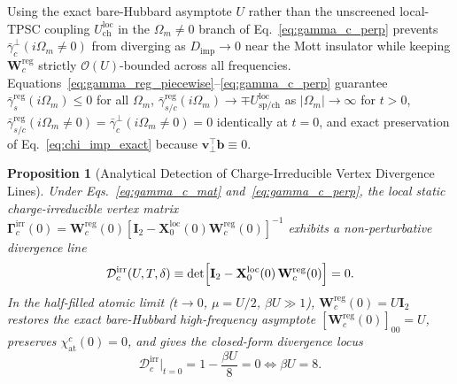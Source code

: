 \documentclass[11pt,a4paper]{article}
\numberwithin{equation}{section}
\theoremstyle{plain}
\newtheorem{proposition}{Proposition}[section]
\theoremstyle{definition}
\begin{document}
Using the exact bare-Hubbard asymptote $U$ rather than the unscreened local-TPSC
coupling $U_{\mathrm{ch}}^{\mathrm{loc}}$ in the $\Omega_m \neq 0$ branch of
Eq.~\eqref{eq:gamma_c_perp} prevents $\bar{\gamma}_c^\perp(i\Omega_m \neq 0)$ from
diverging as $D_{\mathrm{imp}} \to 0$ near the Mott insulator while keeping
$\mathbf{W}_c^{\mathrm{reg}}$ strictly $\mathcal{O}(U)$-bounded across all frequencies.
Equations~\eqref{eq:gamma_reg_piecewise}--\eqref{eq:gamma_c_perp} guarantee
$\bar{\gamma}_s^{\mathrm{reg}}(i\Omega_m) \le 0$ for all $\Omega_m$,
$\bar{\gamma}_{s/c}^{\mathrm{reg}}(i\Omega_m) \to \mp U_{\mathrm{sp/ch}}^{\mathrm{loc}}$
as $|\Omega_m| \to \infty$ for $t > 0$,
$\bar{\gamma}_{s/c}^{\mathrm{reg}}(i\Omega_m \neq 0) = \bar{\gamma}_c^\perp(i\Omega_m \neq 0) = 0$
identically at $t = 0$, and exact preservation of Eq.~\eqref{eq:chi_imp_exact} because
$\mathbf{v}_\perp^\top\mathbf{b} \equiv 0$.

\begin{proposition}[Analytical Detection of Charge-Irreducible Vertex Divergence Lines]
\label{prop:vdiv}
Under Eqs.~\eqref{eq:gamma_c_mat} and~\eqref{eq:gamma_c_perp}, the local static
charge-irreducible vertex matrix
$\mathbf{\Gamma}_c^{\mathrm{irr}}(0) = \mathbf{W}_c^{\mathrm{reg}}(0)[\mathbf{I}_2 - \mathbf{X}_0^{\mathrm{loc}}(0)\mathbf{W}_c^{\mathrm{reg}}(0)]^{-1}$
exhibits a non-perturbative divergence line
\begin{equation}
    \mathcal{D}_c^{\mathrm{irr}}(U, T, \delta)
    \equiv \det\Bigl[\mathbf{I}_2 - \mathbf{X}_0^{\mathrm{loc}}(0)\,\mathbf{W}_c^{\mathrm{reg}}(0)\Bigr] = 0.
    \label{eq:D_irr_c}
\end{equation}
In the half-filled atomic limit ($t \to 0$, $\mu = U/2$, $\beta U \gg 1$),
$\mathbf{W}_c^{\mathrm{reg}}(0) = U\mathbf{I}_2$ restores the exact bare-Hubbard
high-frequency asymptote $[\mathbf{W}_c^{\mathrm{reg}}(0)]_{00} = U$, preserves
$\chi_{\mathrm{at}}^c(0) = 0$, and gives the closed-form divergence locus
\begin{equation}
    \mathcal{D}_c^{\mathrm{irr}}\big|_{t=0} = 1 - \frac{\beta U}{8} = 0
    \iff \beta U = 8.
    \label{eq:atomic_vdiv}
\end{equation}
\end{proposition}
\end{document}
